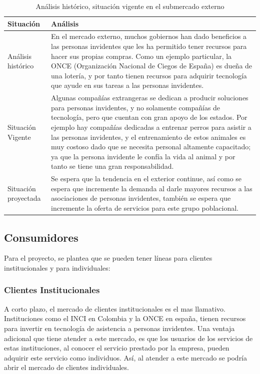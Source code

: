 \documentclass[a4paper, 12pt, oneside]{article}
\begin{document}
	\begin{table}
		\caption{Análisis histórico, situación vigente en el submercado externo}
		\begin{tabular}{ | p{4cm} | p{10cm} | }
		\hline
		Situación & Análisis \\
		\hline					
		Análisis histórico & 
		En el mercado externo, muchos gobiernos han dado beneficios a las personas invidentes que les ha permitido tener recursos para hacer sus propias compras. Como un ejemplo particular, la ONCE (Organización Nacional de Ciegos de España) es dueña de una lotería, y por tanto tienen recursos para adquirir tecnología que ayude en sus tareas a las personas invidentes. \\
		\hline
		Situación Vigente &
		Algunas compañías extrangeras se dedican a producir soluciones para personas invidentes, y no solamente compañías de tecnología, pero que cuentan con gran apoyo de los estados. Por ejemplo hay compañías dedicadas a entrenar perros para asistir a las personas invidentes, y el entrenamiento de estos animales es muy costoso dado que se necesita personal altamente capacitado; ya que la persona invidente le confía la vida al animal y por tanto se tiene una gran responsabilidad. \\
		\hline
		Situación proyectada &
		Se espera que la tendencia en el exterior continue, así como se espera que incremente la demanda al darle mayores recursos a las asociaciones de personas invidentes, también se espera que incremente la oferta de servicios para este grupo poblacional. \\
		\hline
		\end{tabular}
		\label{extHistorico}
	\end{table}
		
	\subsection{Consumidores}
	Para el proyecto, se plantea que se pueden tener líneas para clientes institucionales y para individuales:
	\subsubsection{Clientes Institucionales}
	A corto plazo, el mercado de clientes institucionales es el mas llamativo. Instituciones como el INCI en Colombia y la ONCE en españa, tienen recursos para invertir en tecnología de asistencia a personas invidentes. Una ventaja adicional que tiene atender a este mercado, es que los usuarios de los servicios de estas instituciones, al conocer el servicio prestado por la empresa, pueden adquirir este servicio como individuos. Así, al atender a este mercado se podría abrir el mercado de clientes individuales.
\end{document}
